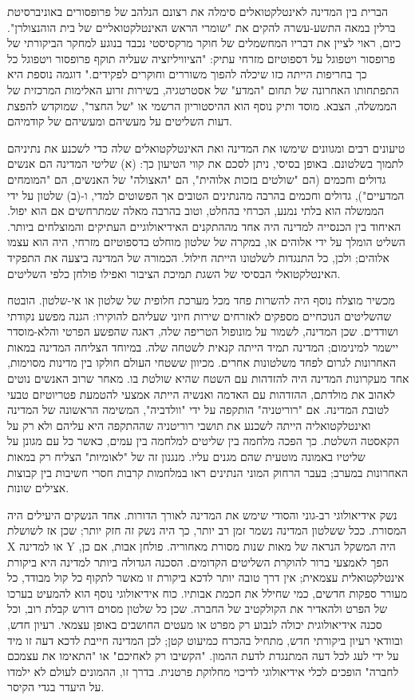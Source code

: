\documentclass[10pt,oneside]{book}
\begin{document}
הברית בין המדינה לאינטלקטואלים סימלה את רצונם הנלהב של פרופסורים באוניברסיטת ברלין במאה התשע-עשרה להקים את "שומרי הראש האינטלקטואליים של בית הוהנצולרן". כיום, ראוי לציין את דבריו המחשמלים של חוקר מרקסיסטי נכבד בנוגע למחקר הביקורתי של פרופסור ויטפוגל על דספוטיזם מזרחי עתיק: "הציוויליזציה שעליה תוקף פרופסור ויטפוגל כל כך בחריפות הייתה כזו שיכלה להפוך משוררים וחוקרים לפקידים." דוגמה נוספת היא התפתחותו האחרונה של תחום "המדע" של אסטרטגיה, בשירות זרוע האלימות המרכזית של הממשלה, הצבא. מוסד ותיק נוסף הוא ההיסטוריון הרשמי או "של החצר", שמוקדש להפצת דעות השליטים על מעשיהם ומעשיהם של קודמיהם.

טיעונים רבים ומגוונים שימשו את המדינה ואת האינטלקטואלים שלה כדי לשכנע את נתיניהם לתמוך בשלטונם. באופן בסיסי, ניתן לסכם את קווי הטיעון כך: (א) שליטי המדינה הם אנשים גדולים וחכמים (הם "שולטים בזכות אלוהית", הם "האצולה" של האנשים, הם "המומחים המדעיים"), גדולים וחכמים בהרבה מהנתינים הטובים אך הפשוטים למדי, ו-(ב) שלטון על ידי הממשלה הוא בלתי נמנע, הכרחי בהחלט, וטוב בהרבה מאלה שמתרחשים אם הוא יפול. האיחוד בין הכנסייה למדינה היה אחד מההתקנים האידיאולוגיים העתיקים והמוצלחים ביותר. השליט הומלך על ידי אלוהים או, במקרה של שלטון מוחלט בדספוטיזם מזרחי, היה הוא עצמו אלוהים; ולכן, כל התנגדות לשלטונו הייתה חילול. הכמורה של המדינה ביצעה את התפקיד האינטלקטואלי הבסיסי של השגת תמיכת הציבור ואפילו פולחן כלפי השליטים.

מכשיר מוצלח נוסף היה להשרות פחד מכל מערכת חלופית של שלטון או אי-שלטון. הובטח שהשליטים הנוכחיים מספקים לאזרחים שירות חיוני שעליהם להוקירו: הגנה מפשע נקודתי ושודדים. שכן המדינה, לשמור על מונופול הטריפה שלה, דאגה שהפשע הפרטי והלא-מוסדר יישמר למינימום; המדינה תמיד הייתה קנאית לשטחה שלה. במיוחד הצליחה המדינה במאות האחרונות לגרום לפחד משלטונות אחרים. מכיוון ששטחי העולם חולקו בין מדינות מסוימות, אחד מעקרונות המדינה היה להזדהות עם השטח שהיא שולטת בו. מאחר שרוב האנשים נוטים לאהוב את מולדתם, ההזדהות עם האדמה ואנשיה הייתה אמצעי להטמעת פטריוטיזם טבעי לטובת המדינה. אם "רוריטניה" הותקפה על ידי "וולדביה", המשימה הראשונה של המדינה ואינטלקטואליה הייתה לשכנע את תושבי רוריטניה שההתקפה היא עליהם ולא רק על הקאסטה השלטת. כך הפכה מלחמה בין שליטים למלחמה בין עמים, כאשר כל עם מגונן על שליטיו באמונה מוטעית שהם מגנים עליו. מנגנון זה של "לאומיות" הצליח רק במאות האחרונות במערב; בעבר הרחוק המוני הנתינים ראו במלחמות קרבות חסרי חשיבות בין קבוצות אצילים שונות.

נשק אידיאולוגי רב-גוני והסודי שימש את המדינה לאורך הדורות. אחד הנשקים היעילים היה המסורת. ככל ששלטון המדינה נשמר זמן רב יותר, כך היה נשק זה חזק יותר; שכן אז לשושלת X או למדינה Y היה המשקל הנראה של מאות שנות מסורת מאחוריה. פולחן אבות, אם כן, הפך לאמצעי ברור להוקרת השליטים הקדומים. הסכנה הגדולה ביותר למדינה היא ביקורת אינטלקטואלית עצמאית; אין דרך טובה יותר לדכא ביקורת זו מאשר לתקוף כל קול מבודד, כל מעורר ספקות חדשים, כמי שחילל את חכמת אבותיו. כוח אידיאולוגי נוסף הוא להמעיט בערכו של הפרט ולהאדיר את הקולקטיב של החברה. שכן כל שלטון מסוים דורש קבלת רוב, וכל סכנה אידיאולוגית יכולה לנבוע רק מפרט או מעטים החושבים באופן עצמאי. רעיון חדש, ובוודאי רעיון ביקורתי חדש, מתחיל בהכרח כמיעוט קטן; לכן המדינה חייבת לדכא דעה זו מיד על ידי לעג לכל דעה המתנגדת לדעת ההמון. "הקשיבו רק לאחיכם" או "התאימו את עצמכם לחברה" הופכים לכלי אידיאולוגי לדיכוי מחלוקת פרטנית. בדרך זו, ההמונים לעולם לא ילמדו על היעדר בגדי הקיסר.
\end{document}
